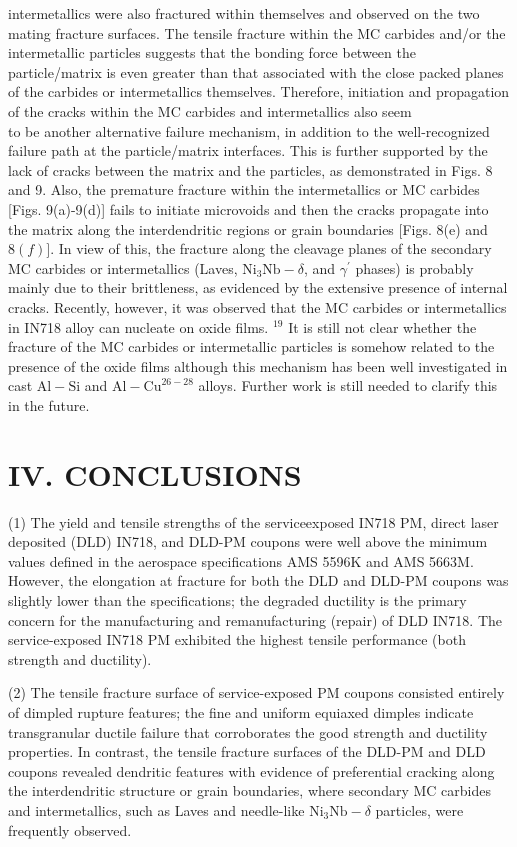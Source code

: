 \documentclass[10pt]{article}
\begin{document}
intermetallics were also fractured within themselves and observed on the two mating fracture surfaces. The tensile fracture within the MC carbides and/or the intermetallic particles suggests that the bonding force between the particle/matrix is even greater than that associated with the close packed planes of the carbides or intermetallics themselves. Therefore, initiation and propagation of the cracks within the MC carbides and intermetallics also seem\\
to be another alternative failure mechanism, in addition to the well-recognized failure path at the particle/matrix interfaces. This is further supported by the lack of cracks between the matrix and the particles, as demonstrated in Figs. 8 and 9. Also, the premature fracture within the intermetallics or MC carbides [Figs. 9(a)-9(d)] fails to initiate microvoids and then the cracks propagate into the matrix along the interdendritic regions or grain boundaries [Figs. 8(e) and $8(f)]$. In view of this, the fracture along the cleavage planes of the secondary MC carbides or intermetallics (Laves, $\mathrm{Ni}_{3} \mathrm{Nb}-\delta$, and $\gamma^{\prime}$ phases) is probably mainly due to their brittleness, as evidenced by the extensive presence of internal cracks. Recently, however, it was observed that the MC carbides or intermetallics in IN718 alloy can nucleate on oxide films. ${ }^{19}$ It is still not clear whether the fracture of the MC carbides or intermetallic particles is somehow related to the presence of the oxide films although this mechanism has been well investigated in cast $\mathrm{Al}-\mathrm{Si}$ and $\mathrm{Al}-\mathrm{Cu}^{26-28}$ alloys. Further work is still needed to clarify this in the future.

\section*{IV. CONCLUSIONS}
(1) The yield and tensile strengths of the serviceexposed IN718 PM, direct laser deposited (DLD) IN718, and DLD-PM coupons were well above the minimum values defined in the aerospace specifications AMS 5596K and AMS 5663M. However, the elongation at fracture for both the DLD and DLD-PM coupons was slightly lower than the specifications; the degraded ductility is the primary concern for the manufacturing and remanufacturing (repair) of DLD IN718. The service-exposed IN718 PM exhibited the highest tensile performance (both strength and ductility).

(2) The tensile fracture surface of service-exposed PM coupons consisted entirely of dimpled rupture features; the fine and uniform equiaxed dimples indicate transgranular ductile failure that corroborates the good strength and ductility properties. In contrast, the tensile fracture surfaces of the DLD-PM and DLD coupons revealed dendritic features with evidence of preferential cracking along the interdendritic structure or grain boundaries, where secondary MC carbides and intermetallics, such as Laves and needle-like $\mathrm{Ni}_{3} \mathrm{Nb}-\delta$ particles, were frequently observed.
\end{document}
